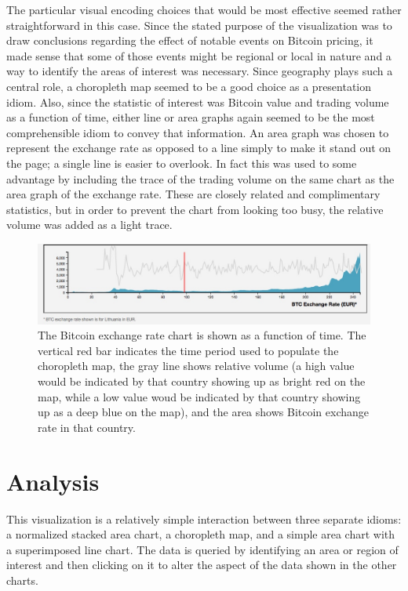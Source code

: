 \documentclass[journal]{vgtc}                %
\begin{document}
The particular visual encoding choices that would be most effective seemed rather straightforward in this case.  Since the stated purpose of the visualization was to draw conclusions regarding the effect of notable events on Bitcoin pricing, it made sense that some of those events might be regional or local in nature and a way to identify the areas of interest was necessary.  Since geography plays such a central role, a choropleth map seemed to be a good choice as a presentation idiom.  Also, since the statistic of interest was Bitcoin value and trading volume as a function of time, either line or area graphs again seemed to be the most comprehensible idiom to convey that information.  An area graph was chosen to represent the exchange rate as opposed to a line simply to make it stand out on the page; a single line is easier to overlook.  In fact this was used to some advantage by including the trace of the trading volume on the same chart as the area graph of the exchange rate.  These are closely related and complimentary statistics, but in order to prevent the chart from looking too busy, the relative volume was added as a light trace.

\begin{figure}
	\centering
	\includegraphics[width=0.9\linewidth]{exchange_rate}
	\caption{The Bitcoin exchange rate chart is shown as a function of time.  The vertical red bar indicates the time period used to populate the choropleth map, the gray line shows relative volume (a high value would be indicated by that country showing up as bright red on the map, while a low value woud be indicated by that country showing up as a deep blue on the map), and the area shows Bitcoin exchange rate in that country. }
	\label{fig:exchangerate}
\end{figure}

\section{Analysis}

This visualization is a relatively simple interaction between three separate idioms: a normalized stacked area chart, a choropleth map, and a simple area chart with a superimposed line chart.  The data is queried by identifying an area or region of interest and then clicking on it to alter the aspect of the data shown in the other charts.\\
\end{document}
